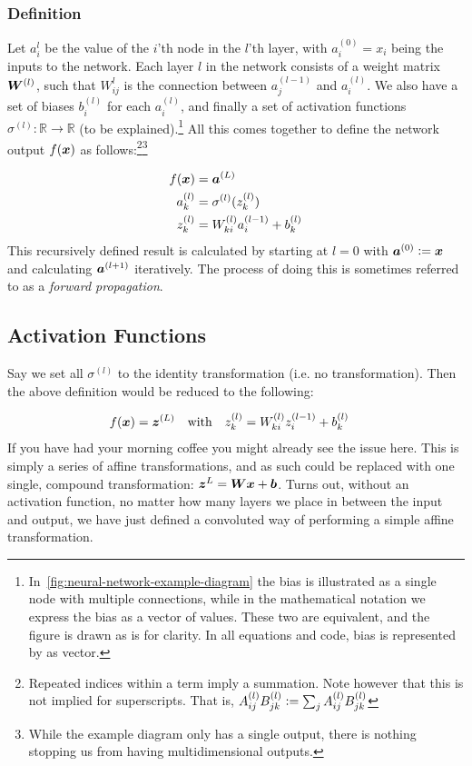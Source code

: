 \documentclass[Thesis.tex]{subfiles}
\begin{document}
\subsubsection{Definition}
\label{sec:ml-ann-forward-def}

 Let $a_i^{l}$ be the value of the $i$'th node in the $l$'th layer, with
$a_i^{(0)}=x_i$ being the inputs to the network. Each layer $l$ in the network
consists of a weight matrix $\bm{W}^{(l)}$, such that $W_{ij}^{l}$ is the
connection between $a_j^{(l-1)}$ and $a_i^{(l)}$. We also have a set of biases
$b_i^{(l)}$ for each $a_i^{(l)}$, and finally a set
of activation functions $\sigma^{(l)}: \mathbb{R}\to\mathbb{R}$ (to be
explained).\footnote{In~\cref{fig:neural-network-example-diagram} the bias is
illustrated as a single node with multiple connections, while in the
mathematical notation we express the bias as a vector of values. These two are
equivalent, and the figure is drawn as is for clarity. In all equations and
code, bias is represented by as vector.} All this comes together to define the network output $f(\bm{x})$ as
follows:\footnote{Repeated indices within a term imply a summation. Note however
that this is not implied for superscripts. That is, $A_{ij}^{(l)}B_{jk}^{(l)}
\vcentcolon= \sum_{j} A_{ij}^{(l)}B_{jk}^{(l)}$}\footnote{While the example diagram
only has a single output, there is nothing stopping us from having
multidimensional outputs.}


 \begin{align}
   f(\bm{x}) &= \bm{a}^{(L)}\\
   a_k^{(l)} &= \sigma^{(l)}(z_k^{(l)})\\
   z_k^{(l)} &= W^{(l)}_{ki}a_i^{(l-1)} + b^{(l)}_k
 \end{align}
This recursively defined result is calculated by starting at $l=0$ with
$\bm{a}^{(0)}\vcentcolon= \bm{x}$ and calculating $\bm{a}^{(l+1)}$ iteratively. The
process of doing this is sometimes referred to as a \emph{forward propagation}.


\subsection{Activation Functions}
\label{sec:ml-activation-functions}

Say we set all $\sigma^{(l)}$ to the identity transformation (i.e. no
transformation). Then the above definition would be reduced to the following:

\begin{align}
  f(\vx) = \vb{z}^{(L)}\qq{with}
   z_k^{(l)} &= W^{(l)}_{ki}z_i^{(l-1)} + b^{(l)}_k
\end{align}
If you have had your morning coffee you might already see the issue here. This
is simply a series of affine transformations, and as such could be replaced with
one single, compound transformation: $\bm{z}^{L} = \bm{W}\bm{x} + \bm{b}$. Turns
out, without an activation function, no matter how many layers we place in
between the input and output, we have just defined a convoluted way of
performing a simple affine transformation.
\end{document}
